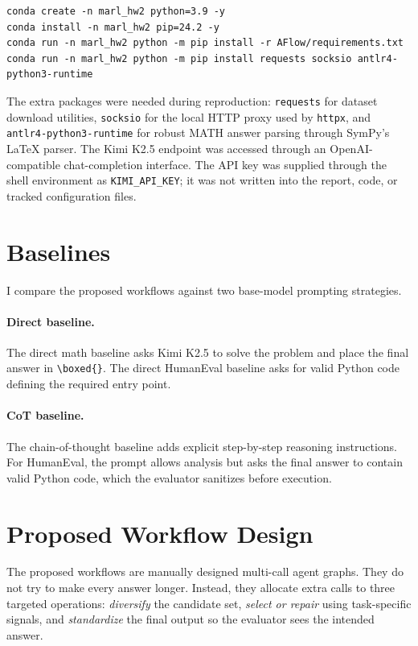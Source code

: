 \documentclass{article}
\begin{document}
\begin{verbatim}
conda create -n marl_hw2 python=3.9 -y
conda install -n marl_hw2 pip=24.2 -y
conda run -n marl_hw2 python -m pip install -r AFlow/requirements.txt
conda run -n marl_hw2 python -m pip install requests socksio antlr4-python3-runtime
\end{verbatim}

The extra packages were needed during reproduction: \texttt{requests} for dataset download utilities, \texttt{socksio} for the local HTTP proxy used by \texttt{httpx}, and \texttt{antlr4-python3-runtime} for robust MATH answer parsing through SymPy's LaTeX parser. The Kimi K2.5 endpoint was accessed through an OpenAI-compatible chat-completion interface. The API key was supplied through the shell environment as \texttt{KIMI\_API\_KEY}; it was not written into the report, code, or tracked configuration files.

\section{Baselines}

I compare the proposed workflows against two base-model prompting strategies.

\paragraph{Direct baseline.} The direct math baseline asks Kimi K2.5 to solve the problem and place the final answer in \texttt{\textbackslash boxed\{\}}. The direct HumanEval baseline asks for valid Python code defining the required entry point.

\paragraph{CoT baseline.} The chain-of-thought baseline adds explicit step-by-step reasoning instructions. For HumanEval, the prompt allows analysis but asks the final answer to contain valid Python code, which the evaluator sanitizes before execution.

\section{Proposed Workflow Design}

The proposed workflows are manually designed multi-call agent graphs. They do not try to make every answer longer. Instead, they allocate extra calls to three targeted operations: \emph{diversify} the candidate set, \emph{select or repair} using task-specific signals, and \emph{standardize} the final output so the evaluator sees the intended answer.
\end{document}
